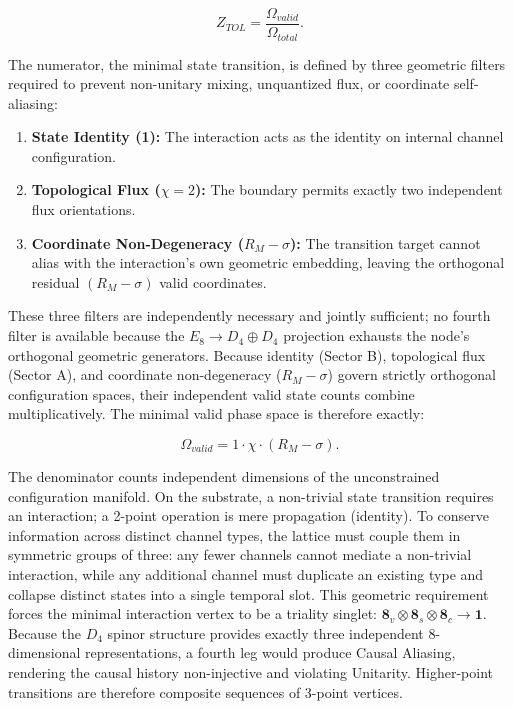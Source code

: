 \begin{equation}
    Z_{TOL} = \frac{\Omega_{valid}}{\Omega_{total}}.
\end{equation}

The numerator, the minimal state transition, is defined by three geometric filters required to prevent non-unitary mixing, unquantized flux, or coordinate self-aliasing:
\begin{enumerate}
    \item \textbf{State Identity (1):} The interaction acts as the identity on internal channel configuration.
    \item \textbf{Topological Flux ($\chi=2$):} The boundary permits exactly two independent flux orientations.
    \item \textbf{Coordinate Non-Degeneracy ($R_M - \sigma$):} The transition target cannot alias with the interaction's own geometric embedding, leaving the orthogonal residual $(R_M - \sigma)$ valid coordinates.
\end{enumerate}

These three filters are independently necessary and jointly sufficient; no fourth filter is available because the $E_8\to D_4\oplus D_4$ projection exhausts the node's orthogonal geometric generators. Because identity (Sector B), topological flux (Sector A), and coordinate non-degeneracy ($R_M - \sigma$) govern strictly orthogonal configuration spaces, their independent valid state counts combine multiplicatively. The minimal valid phase space is therefore exactly:

\begin{equation}
    \Omega_{valid} = 1 \cdot \chi \cdot (R_M - \sigma).
\end{equation}

The denominator counts independent dimensions of the unconstrained configuration manifold. On the substrate, a non-trivial state transition requires an interaction; a 2-point operation is mere propagation (identity). To conserve information across distinct channel types, the lattice must couple them in symmetric groups of three: any fewer channels cannot mediate a non-trivial interaction, while any additional channel must duplicate an existing type and collapse distinct states into a single temporal slot. This geometric requirement forces the minimal interaction vertex to be a triality singlet: $\mathbf{8}_v \otimes \mathbf{8}_s \otimes \mathbf{8}_c \to \mathbf{1}$. Because the $D_4$ spinor structure provides exactly three independent 8-dimensional representations, a fourth leg would produce Causal Aliasing, rendering the causal history non-injective and violating Unitarity. Higher-point transitions are therefore composite sequences of 3-point vertices.

